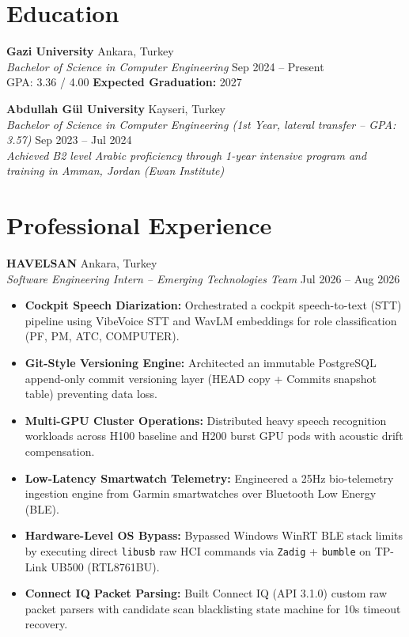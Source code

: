 \documentclass[10pt, a4paper]{article}
\begin{document}
\section{Education}

\textbf{Gazi University} \hfill Ankara, Turkey \\
\textit{Bachelor of Science in Computer Engineering} \hfill Sep 2024 -- Present \\
GPA: 3.36 / 4.00 \hfill \textbf{Expected Graduation:} 2027

\vspace{0.08cm}

\textbf{Abdullah G\"{u}l University} \hfill Kayseri, Turkey \\
\textit{Bachelor of Science in Computer Engineering (1st Year, lateral transfer -- GPA: 3.57)} \hfill Sep 2023 -- Jul 2024\\
\textit{Achieved B2 level Arabic proficiency through 1-year intensive program and training in Amman, Jordan (Ewan Institute)}

\section{Professional Experience}

\textbf{HAVELSAN} \hfill Ankara, Turkey \\
\textit{Software Engineering Intern -- Emerging Technologies Team} \hfill Jul 2026 -- Aug 2026
\begin{itemize}
    \item \textbf{Cockpit Speech Diarization:} Orchestrated a cockpit speech-to-text (STT) pipeline using VibeVoice STT and WavLM embeddings for role classification (PF, PM, ATC, COMPUTER).
    \item \textbf{Git-Style Versioning Engine:} Architected an immutable PostgreSQL append-only commit versioning layer (HEAD copy + Commits snapshot table) preventing data loss.
    \item \textbf{Multi-GPU Cluster Operations:} Distributed heavy speech recognition workloads across H100 baseline and H200 burst GPU pods with acoustic drift compensation.
    \item \textbf{Low-Latency Smartwatch Telemetry:} Engineered a 25Hz bio-telemetry ingestion engine from Garmin smartwatches over Bluetooth Low Energy (BLE).
    \item \textbf{Hardware-Level OS Bypass:} Bypassed Windows WinRT BLE stack limits by executing direct \texttt{libusb} raw HCI commands via \texttt{Zadig} + \texttt{bumble} on TP-Link UB500 (RTL8761BU).
    \item \textbf{Connect IQ Packet Parsing:} Built Connect IQ (API 3.1.0) custom raw packet parsers with candidate scan blacklisting state machine for 10s timeout recovery.
\end{itemize}
\end{document}

